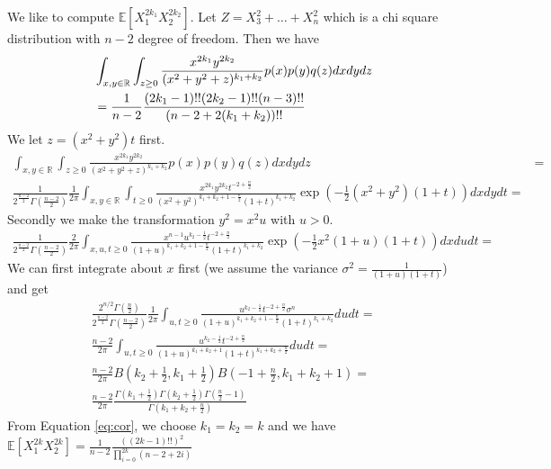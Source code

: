 \documentclass{article}
\def\E{\mathbb{E}}
\begin{document}
We like to compute $\E[X_1^{2k_1} X_2^{2k_2}]$. Let $ Z = X_3^2 + \dots + X_n^2$ which is a chi square distribution with $n-2$ degree of freedom.
Then we have
\begin{align}\label{eq:cor}
&\int_{x,y\in \mathbb{R}}\int_{z\geq 0} \frac{x^{2k_1} y^{2k_2}}{(x^2+y^2+z)^{k_1 + k_2}} p(x)p(y)q(z) dxdydz \notag\\
&=\frac{1}{n-2}\frac{(2k_1 -1)!!(2k_2-1)!! (n-3)!!}{(n-2 + 2(k_1 + k_2))!!}
\end{align}
We let $z=(x^2+y^2)t$ first.
\begin{align*}
\int_{x,y\in \mathbb{R}}\int_{z\geq 0} \frac{x^{2k_1} y^{2k_2}}{(x^2+y^2+z)^{k_1 + k_2}} p(x)p(y)q(z) dxdydz & =\\
\frac{1}{2^{\frac{n-2}{2}}\Gamma(\frac{n-2}{2})}\frac{1}{2\pi} \int_{x,y\in \mathbb{R}}\int_{t\geq 0}\frac{x^{2k_1} y^{2k_2}t^{-2+\frac{n}{2}}}{(x^2+y^2)^{k_1 + k_2+1-\frac{n}{2}}(1+t)^{k_1 + k_2}}\exp(-\frac{1}{2}(x^2+y^2)(1+t))dxdydt =
\end{align*}
Secondly we make the transformation $y^2=x^2u$ with $u>0$.
\begin{align*}
\frac{1}{2^{\frac{n-2}{2}}\Gamma(\frac{n-2}{2})}\frac{2}{2\pi}\int_{x,u,t\geq 0}\frac{x^{n-1} u^{k_2 - \frac{1}{2}}t^{-2+\frac{n}{2}}}{(1+u)^{k_1 + k_2+1-\frac{n}{2}}(1+t)^{k_1 + k_2}}\exp(-\frac{1}{2}x^2(1+u)(1+t))dxdudt =
\end{align*}
We can first integrate about $x$ first (we assume the variance $\sigma^2 = \frac{1}{(1+u)(1+t)}$)
and get
\begin{align*}
\frac{2^{n/2} \Gamma(\frac{n}{2})}{2^{\frac{n-2}{2}}\Gamma(\frac{n-2}{2})}\frac{1}{2\pi}\int_{u,t\geq 0} \frac{u^{k_2 - \frac{1}{2}}t^{-2+\frac{n}{2}}\sigma^n}{(1+u)^{k_1 + k_2+1-\frac{n}{2}}(1+t)^{k_1 + k_2}}dudt = \\
\frac{n-2}{2\pi}\int_{u,t\geq 0} \frac{u^{k_2 - \frac{1}{2}}t^{-2+\frac{n}{2}}}{(1+u)^{k_1 + k_2+1}(1+t)^{k_1 + k_2 + \frac{n}{2}}}dudt = \\
\frac{n-2}{2\pi} B(k_2 + \frac{1}{2}, k_1 + \frac{1}{2}) B(-1+\frac{n}{2}, k_1 + k_2 + 1) =\\
\frac{n-2}{2\pi} \frac{\Gamma(k_1 + \frac{1}{2}) \Gamma(k_2 + \frac{1}{2})\Gamma(\frac{n}{2}-1)}{\Gamma(k_1 + k_2 + \frac{n}{2})}
\end{align*}
From Equation \eqref{eq:cor}, we choose $k_1 = k_2 = k$ and we have
$\E[X_1^{2k}X_2^{2k}]=\frac{1}{n-2}\frac{((2k-1)!!)^2}{\prod_{i=0}^{2k} (n-2 + 2i)}$
\end{document}
